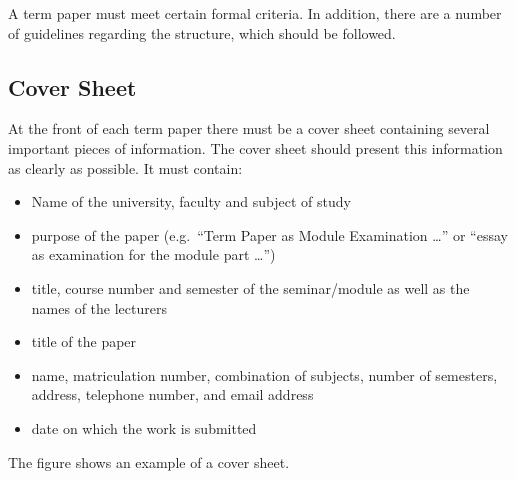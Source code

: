 \documentclass[
  english,
]{scrreprt}
\begin{document}
A term paper must meet certain formal criteria. In addition, there are a number of guidelines regarding the structure, which should be followed.

\subsection{Cover Sheet}\label{cover-sheet}

At the front of each term paper there must be a cover sheet containing several important pieces of information. The cover sheet should present this information as clearly as possible. It must contain:

\begin{itemize}
\item
  Name of the university, faculty and subject of study
\item
  purpose of the paper (e.g.~“Term Paper as Module Examination …” or “essay as examination for the module part …”)
\item
  title, course number and semester of the seminar/module as well as the names of the lecturers
\item
  title of the paper
\item
  name, matriculation number, combination of subjects, number of semesters, address, telephone number, and email address
\item
  date on which the work is submitted
\end{itemize}

The figure shows an example of a cover sheet.
\end{document}
